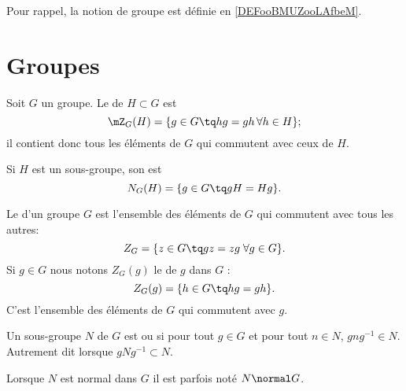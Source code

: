 
Pour rappel, la notion de groupe est définie en \ref{DEFooBMUZooLAfbeM}.

\section{Groupes}

\begin{definition}
    Soit \( G\) un groupe. Le  de \( H\subset G\) est
    \begin{equation}
        \mZ_G(H)=\{ g\in G\tq hg=gh\,\forall h\in H\};
    \end{equation}
    il contient donc tous les éléments de \( G\) qui commutent avec ceux de \( H\).

    Si \( H\) est un sous-groupe, son  est
    \begin{equation}
        N_G(H)=\{ g\in G\tq gH=Hg \}.
    \end{equation}
\end{definition}

\begin{definition}\label{defGroupeCentre}
Le  d'un groupe \( G\) est l'ensemble des éléments de \( G\) qui commutent avec tous les autres:
\begin{equation}
    Z_G=\{ z\in G\tq gz=zg\;\forall g\in G \}.
\end{equation}
Si \( g\in G\) nous notons \( Z_G(g)\) le  de \( g\) dans \( G\) :
\begin{equation}
    Z_G(g)=\{h\in G\tq hg=gh\}.
\end{equation}
C'est l'ensemble des éléments de \( G\) qui commutent avec \( g\).


\end{definition}

\begin{definition}\label{DEFooNIIMooFkZgvX}
    Un sous-groupe \( N\) de \( G\) est  ou  si pour tout \( g\in G\) et pour tout \( n\in N\), \( gng^{-1}\in N\). Autrement dit lorsque \( gNg^{-1}\subset N\).

    Lorsque \( N\) est normal dans \( G\) il est parfois noté \( N\normal G\).
\end{definition}

